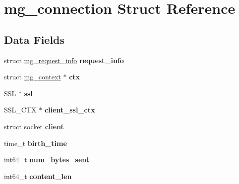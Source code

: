 \hypertarget{structmg__connection}{}\section{mg\+\_\+connection Struct Reference}
\label{structmg__connection}
\subsection*{Data Fields}
\begin{DoxyCompactItemize}
\item 
\mbox{\label{structmg__connection_ab2c448b0d885bca25578872ca4362c89}} 
struct \mbox{\hyperlink{structmg__request__info}{mg\+\_\+request\+\_\+info}} {\bfseries request\+\_\+info}
\item 
\mbox{\label{structmg__connection_ae5e51df4d11b955f3153d9581a267a75}} 
struct \mbox{\hyperlink{structmg__context}{mg\+\_\+context}} $\ast$ {\bfseries ctx}
\item 
\mbox{\label{structmg__connection_ac376c70a4f827896a0152d704233424b}} 
S\+SL $\ast$ {\bfseries ssl}
\item 
\mbox{\label{structmg__connection_a293009823a7fd3a347193962d2a5b0ca}} 
S\+S\+L\+\_\+\+C\+TX $\ast$ {\bfseries client\+\_\+ssl\+\_\+ctx}
\item 
\mbox{\label{structmg__connection_a6a9f2b9d1087412cac4187ce5a44d274}} 
struct \mbox{\hyperlink{structsocket}{socket}} {\bfseries client}
\item 
\mbox{\label{structmg__connection_a14395e56adc28e7e7a635ad08999fbf5}} 
time\+\_\+t {\bfseries birth\+\_\+time}
\item 
\mbox{\label{structmg__connection_a482f3e0e76b5e4b885c971ab232f7653}} 
int64\+\_\+t {\bfseries num\+\_\+bytes\+\_\+sent}
\item 
\mbox{\label{structmg__connection_a168cfc671a07bf2360ae806193c015bc}} 
int64\+\_\+t {\bfseries content\+\_\+len}
\item 
\mbox{\label{structmg__connection_a271e16e618bd9265577aef7ef5ed637d}} 

\end{DoxyCompactItemize}
